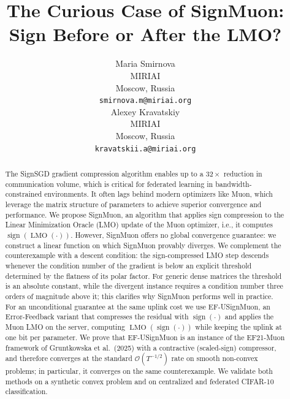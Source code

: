 \documentclass{article}
\title{The Curious Case of SignMuon: Sign Before or After the LMO?}
\author{
Maria Smirnova\\
  MIRIAI\\
  Moscow, Russia\\
  \texttt{smirnova.m@miriai.org}\\
  \And
  Alexey Kravatskiy \\
  MIRIAI\\
  Moscow, Russia\\
  \texttt{kravatskii.a@miriai.org}\\
}
\begin{document}
\maketitle

\begin{abstract}\label{sec:abs}
The SignSGD gradient compression algorithm enables up to a $32\times$ reduction in communication volume, which is critical for federated learning in bandwidth-constrained environments. It often lags behind modern optimizers like Muon, which leverage the matrix structure of parameters to achieve superior convergence and performance. We propose SignMuon, an algorithm that applies sign compression to the Linear Minimization Oracle (LMO) update of the Muon optimizer, i.e., it computes $\operatorname{sign}(\operatorname{LMO}(\cdot))$. However, SignMuon offers no global convergence guarantee: we construct a linear function on which SignMuon provably diverges. We complement the counterexample with a descent condition: the sign-compressed LMO step descends whenever the condition number of the gradient is below an explicit threshold determined by the flatness of its polar factor. For generic dense matrices the threshold is an absolute constant, while the divergent instance requires a condition number three orders of magnitude above it; this clarifies why SignMuon performs well in practice. For an unconditional guarantee at the same uplink cost we use EF-USignMuon, an Error-Feedback variant that compresses the residual with $\operatorname{sign}(\cdot)$ and applies the Muon LMO on the server, computing $\operatorname{LMO}(\operatorname{sign}(\cdot))$ while keeping the uplink at one bit per parameter. We prove that EF-USignMuon is an instance of the EF21-Muon framework of Gruntkowska et al.\ (2025) with a contractive (scaled-sign) compressor, and therefore converges at the standard $\mathcal{O}(T^{-1/2})$ rate on smooth non-convex problems; in particular, it converges on the same counterexample. We validate both methods on a synthetic convex problem and on centralized and federated CIFAR-10 classification.
\end{abstract}


\end{document}
